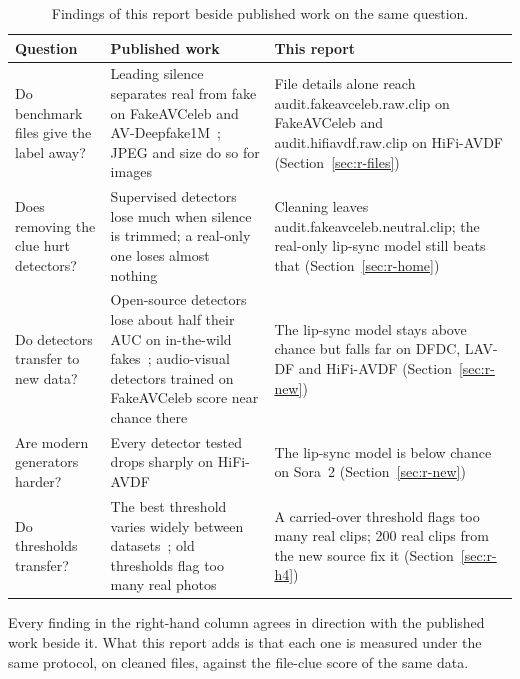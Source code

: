 \begin{table}[ht]
    \centering
    \small
    \caption{Findings of this report beside published work on the same question.}
    \label{tab:published}
    \begin{tabularx}{\textwidth}{@{}>{\raggedright\arraybackslash}p{3.2cm}>{\raggedright\arraybackslash}X>{\raggedright\arraybackslash}X@{}}
        \toprule
        \textbf{Question} & \textbf{Published work} & \textbf{This report} \\
        \midrule
        Do benchmark files give the label away? & Leading silence separates real from fake on FakeAVCeleb and AV-Deepfake1M~\cite{smeu2025,deepfakedoctor}; JPEG and size do so for images~\cite{grommelt2024} & File details alone reach {{audit.fakeavceleb.raw.clip}} on FakeAVCeleb and {{audit.hifiavdf.raw.clip}} on HiFi-AVDF (Section~\ref{sec:r-files}) \\
        Does removing the clue hurt detectors? & Supervised detectors lose much when silence is trimmed; a real-only one loses almost nothing~\cite{smeu2025} & Cleaning leaves {{audit.fakeavceleb.neutral.clip}}; the real-only lip-sync model still beats that (Section~\ref{sec:r-home}) \\
        Do detectors transfer to new data? & Open-source detectors lose about half their AUC on in-the-wild fakes~\cite{dfeval2024}; audio-visual detectors trained on FakeAVCeleb score near chance there~\cite{dfdlab2026} & The lip-sync model stays above chance but falls far on DFDC, LAV-DF and HiFi-AVDF (Section~\ref{sec:r-new}) \\
        Are modern generators harder? & Every detector tested drops sharply on HiFi-AVDF~\cite{havic} & The lip-sync model is below chance on Sora~2 (Section~\ref{sec:r-new}) \\
        Do thresholds transfer? & The best threshold varies widely between datasets~\cite{nguyen2026}; old thresholds flag too many real photos~\cite{laionmobile2026} & A carried-over threshold flags too many real clips; 200 real clips from the new source fix it (Section~\ref{sec:r-h4}) \\
        \bottomrule
    \end{tabularx}
\end{table}

Every finding in the right-hand column agrees in direction with the published
work beside it. What this report adds is that each one is measured under the
same protocol, on cleaned files, against the file-clue score of the same data.

